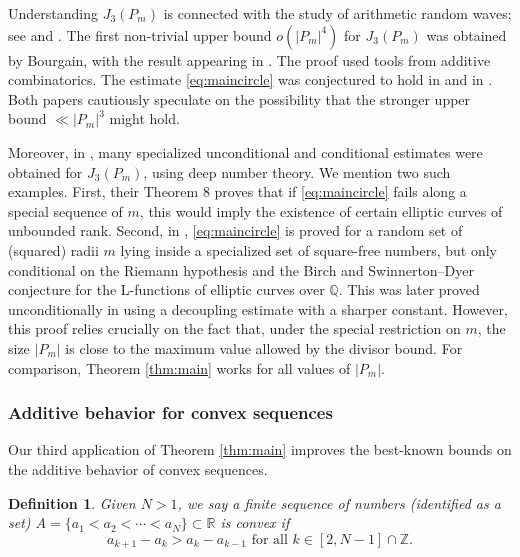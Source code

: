 \documentclass{amsart}
\numberwithin{equation}{section}
\newtheorem{definition}[theorem]{Definition}
\newcommand{\ZR}{\mathbb{R}}
\newcommand{\ZQ}{\mathbb{Q}}
\newcommand{\ZZ}{\mathbb{Z}}
\begin{document}
Understanding $J_3(P_m)$ is connected with the study of arithmetic random waves; see \cite{Krishnapur-Kurlberg-Wigman} and \cite{Bombieri-Bourgain}. 
The first non-trivial upper bound $o(|P_m|^{4})$ for $J_3(P_m)$ was obtained by Bourgain, with the result appearing in \cite[Theorem 2.2]{Krishnapur-Kurlberg-Wigman}. 
The proof used tools from additive combinatorics. 
The estimate \eqref{eq:maincircle} was conjectured to hold in \cite[page 710]{Krishnapur-Kurlberg-Wigman} and in \cite[page 3344]{Bombieri-Bourgain}. 
Both papers cautiously speculate on the possibility that the stronger upper bound $\ll|P_m|^3$ might hold. 



Moreover, in \cite{Bombieri-Bourgain}, many specialized unconditional and conditional estimates were obtained for $J_3(P_m)$, using deep number theory.
We mention two such examples. 
First, their Theorem 8 proves that if \eqref{eq:maincircle} fails along a special sequence of $m$, this would imply the existence of certain elliptic curves of unbounded rank.
Second, in \cite[Theorem 25]{Bombieri-Bourgain},  \eqref{eq:maincircle} is proved for a random set of (squared) radii $m$ lying inside a specialized set of square-free numbers, but only conditional on the Riemann hypothesis and the Birch and Swinnerton--Dyer conjecture for the L-functions of elliptic curves over $\ZQ$. 
This was later proved unconditionally in \cite{Bourgain-Li} using a decoupling estimate with a sharper constant. 
However, this proof relies crucially on the fact that, under the special restriction on $m$, the size $|P_m|$ is close to the maximum value allowed by the divisor bound. 
For comparison, Theorem \ref{thm:main} works for all values of $|P_m|$.




\medskip

\subsubsection{Additive behavior for convex sequences}
\label{section-sumset-convex}

Our third application of Theorem \ref{thm:main} improves the best-known bounds on the additive behavior of convex sequences.

\begin{definition}
    Given $N>1$, we say a finite sequence of numbers (identified as a set) $A=\{a_1<a_2<\cdots<a_N\}\subset\ZR$ is \emph{convex} if 
    \[
    a_{k+1}-a_k>a_k-a_{k-1} \text{ for all $k\in[2,N-1]\cap \ZZ$}.
    \]
\end{definition}
\end{document}
